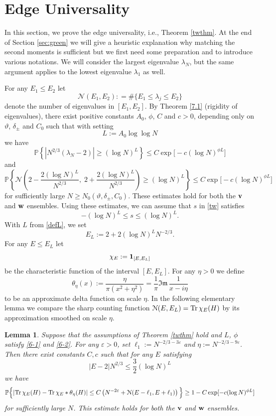 \documentclass[draft]{article}
\newcommand{\ttau}{\vartheta}
\newcommand{\e}{\varepsilon}
\newcommand{\abs}[1]{\left| #1 \right|}
\newcommand{\tr}{\mbox{Tr\,}}
\newcommand{\bv}{{\bf{v}}}
\newcommand{\bw}{{\bf{w}}}
\newcommand{\be}{\begin{equation}}
\newcommand{\ee}{\end{equation}}
\newcommand{\la}{\lambda}
\newcommand{\cN}{{\mathcal N}}
\newcommand{\im}{{\mathfrak{Im} \, }}
\renewcommand{\P}{{\mathbb P}}
\newtheorem{lemma}[theorem]{Lemma}
\newcommand{\qed}{\hfill\fbox{}\par\vspace{0.3mm}}
\numberwithin{equation}{section}
\numberwithin{theorem}{section}
\numberwithin{definition}{section}
\numberwithin{remark}{section}
\begin{document}
\qed






\section{Edge Universality  }




In this section, we prove the edge universality, i.e.,  Theorem \ref{twthm}. 
At the end of Section \ref{sec:green} we will give a
 heuristic explanation  why matching the second moments is sufficient but
we first  need  some preparation and to introduce various notations.
We will consider the largest eigenvalue $\lambda_N$, but
the same argument applies to the lowest eigenvalue $\lambda_1$ as well.

For any $E_1\le E_2$ let
$$
   \cN(E_1, E_2): = \#\{ E_1\le \la_j\le E_2\}
$$
denote the number of eigenvalues in $[E_1, E_2]$.
By  Theorem \ref{7.1} (rigidity of eigenvalues), there exist positive constants $A_0$, $\phi$,
  $C$ and $c>0$,  
depending only on  $\ttau$, $\delta_\pm$  and $C_0$ such that with setting 
\be
L:= A_0\log\log N
\label{defL}
\ee
we have 
 \be\label{6-1}
 \P \left\{ \abs{N^{2/3} ( \la_N -2) }\geq (\log N)^{L} \right\} 
\leq C\exp{\big[-c(\log N)^{\phi L} \big]}
\ee 
and 
\be\label{6-2}
 \P\left\{ \cN\left(2-\frac{2(\log N)^L}{ N^{2/3}},\;2+\frac{2(\log N)^L}{ N^{2/3}}\right)\geq
  (\log N)^{L} \right\} \leq C\exp{\big[-c(\log N)^{\phi L} \big]}
\ee 
for sufficiently large $N\ge N_0(\ttau, \delta_\pm, C_0)$.
 These estimates hold for both the $\bv$ and $\bw$ ensembles. 
Using these estimates,  we can assume    that $s$ in \eqref{tw} satisfies  
\be\label{25}
-(\log N)^{L} \le s \le (\log N)^{L}.
\ee
With  $L$ from \eqref{defL}, we set 
\be\label{defEL}
E_L:= 2+2(\log N)^{L}N^{-2/3}.
\ee
For any $E\le E_L$ let 
\[
\chi_E := {\bf 1}_{[E, E_L]}
\]
be the characteristic function of the interval $[E, E_L]$. For
any $\eta>0$ we 
define
\be\label{thetam}
\theta_\eta(x):=\frac{\eta }{\pi(x^2+\eta^2)} = \frac{1}{\pi} \im \frac{1}{x-i\eta}
\ee
to be an approximate delta function on scale $\eta$.
In the following elementary lemma we compare the sharp counting function
$\cN(E, E_L)= \tr \chi_E(H)$ by its approximation smoothed  on scale $\eta$.

\begin{lemma}\label{lem:21} 
Suppose that the assumptions of Theorem \ref{twthm} hold
and $L$, $\phi$ satisfy \eqref{6-1} and \eqref{6-2}. 
For any  $\e>0$, set $\ell_1:=N^{-2/3-3\e}$ and $\eta:=N^{-2/3-9\e}$. 
Then there exist constants $C, c$  such that
for any $E$ satisfying
\be\label{E-2N}
|E-2|N^{2/3}\leq \frac 3 2(\log N)^L
\ee
we have
\be\label{6.10}
\P \Big\{  |\tr \chi_E(H) - \tr  \chi_E  \ast \theta_\eta (H)|  \le C\left( N^{-2\e}  
 +   \cN (E-\ell_1, E+\ell_1)  \right) \Big\} \ge 1- C \exp[-c(\log N)^{\phi L}]
\ee
for  sufficiently large $N$. This estimate holds
for both  the $\bv$ and $\bw$ ensembles.
\end{lemma}
\end{document}
